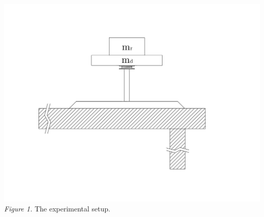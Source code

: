 \documentclass[12pt,letterpaper]{article}
\begin{document}
\begin{center}
\hspace{.85in}
\includegraphics[scale=0.28]{lr4.png}
\newline\newline
\textit{Figure 1.} The experimental setup.
\end{center}%

%
\end{document}

